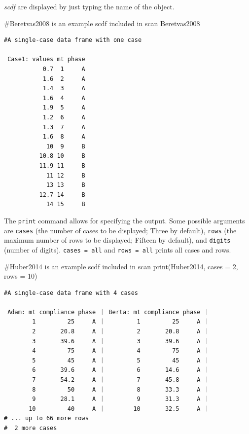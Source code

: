\documentclass[
  letterpaper,
  DIV=11,
  numbers=noendperiod]{scrreprt}
\newenvironment{Shaded}{\begin{snugshade}}{\end{snugshade}}
\newcommand{\AttributeTok}[1]{\textcolor[rgb]{0.40,0.45,0.13}{#1}}
\newcommand{\CommentTok}[1]{\textcolor[rgb]{0.37,0.37,0.37}{#1}}
\newcommand{\DecValTok}[1]{\textcolor[rgb]{0.68,0.00,0.00}{#1}}
\newcommand{\FunctionTok}[1]{\textcolor[rgb]{0.28,0.35,0.67}{#1}}
\newcommand{\NormalTok}[1]{\textcolor[rgb]{0.00,0.23,0.31}{#1}}
\begin{document}
\emph{scdf} are displayed by just typing the name of the object.

\begin{Shaded}
\begin{Highlighting}[]
\CommentTok{\#Beretvas2008 is an example scdf included in scan}
\NormalTok{Beretvas2008}
\end{Highlighting}
\end{Shaded}

\begin{verbatim}
#A single-case data frame with one case

 Case1: values mt phase
           0.7  1     A
           1.6  2     A
           1.4  3     A
           1.6  4     A
           1.9  5     A
           1.2  6     A
           1.3  7     A
           1.6  8     A
            10  9     B
          10.8 10     B
          11.9 11     B
            11 12     B
            13 13     B
          12.7 14     B
            14 15     B
\end{verbatim}

The \texttt{print} command allows for specifying the output. Some
possible arguments are \texttt{cases} (the number of cases to be
displayed; Three by default), \texttt{rows} (the maximum number of rows
to be displayed; Fifteen by default), and \texttt{digits} (number of
digits). \texttt{cases\ =\ \textquotesingle{}all\textquotesingle{}} and
\texttt{rows\ =\ \textquotesingle{}all\textquotesingle{}} prints all
cases and rows.

\begin{Shaded}
\begin{Highlighting}[]
\CommentTok{\#Huber2014 is an example scdf included in scan}
\FunctionTok{print}\NormalTok{(Huber2014, }\AttributeTok{cases =} \DecValTok{2}\NormalTok{, }\AttributeTok{rows =} \DecValTok{10}\NormalTok{)}
\end{Highlighting}
\end{Shaded}

\begin{verbatim}
#A single-case data frame with 4 cases

 Adam: mt compliance phase ｜ Berta: mt compliance phase ｜
        1         25     A ｜         1         25     A ｜
        2       20.8     A ｜         2       20.8     A ｜
        3       39.6     A ｜         3       39.6     A ｜
        4         75     A ｜         4         75     A ｜
        5         45     A ｜         5         45     A ｜
        6       39.6     A ｜         6       14.6     A ｜
        7       54.2     A ｜         7       45.8     A ｜
        8         50     A ｜         8       33.3     A ｜
        9       28.1     A ｜         9       31.3     A ｜
       10         40     A ｜        10       32.5     A ｜
# ... up to 66 more rows
#  2 more cases
\end{verbatim}
\end{document}
